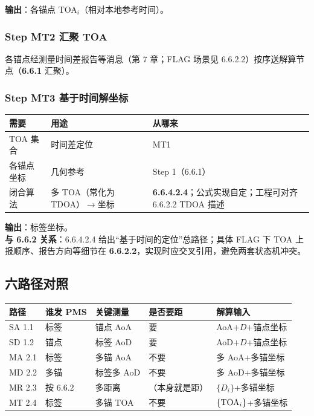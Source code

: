 \documentclass[11pt,a4paper]{ctexart}
\begin{document}
\textbf{输出}：各锚点 TOA$_i$（相对本地参考时间）。

\subsubsection{Step MT2 汇聚 TOA}

各锚点经测量时间差报告等消息（第 7 章；FLAG 场景见 6.6.2.2）按序送解算节点（\textbf{6.6.1} 汇聚）。

\subsubsection{Step MT3 基于时间解坐标}

\begin{table}[h]
\centering
\small
\begin{tabular}{L{3.4cm}L{4.8cm}L{4.8cm}}
\toprule
\textbf{需要} & \textbf{用途} & \textbf{从哪来} \\
\midrule
TOA 集合 & 时间差定位 & MT1 \\
各锚点坐标 & 几何参考 & Step 1（6.6.1） \\
闭合算法 & 多 TOA（常化为 TDOA）$\rightarrow$坐标 &
  \textbf{6.6.4.2.4}；公式实现自定；工程可对齐 6.6.2.2 TDOA 描述 \\
\bottomrule
\end{tabular}
\end{table}

\textbf{输出}：标签坐标。\\
\textbf{与 6.6.2 关系}：6.6.4.2.4 给出``基于时间的定位''总路径；具体 FLAG 下 TOA 上报顺序、报告方向等细节在 \textbf{6.6.2.2}，实现时应交叉引用，避免两套状态机冲突。

\subsection{六路径对照}

\begin{table}[h]
\centering
\small
\begin{tabular}{L{2.0cm}L{2.2cm}L{2.4cm}L{2.4cm}L{3.2cm}}
\toprule
\textbf{路径} & \textbf{谁发 PMS} & \textbf{关键测量} & \textbf{是否要距} & \textbf{解算输入} \\
\midrule
SA 1.1 & 标签 & 锚点 AoA & 要 & AoA+$D$+锚点坐标 \\
SD 1.2 & 锚点 & 标签 AoD & 要 & AoD+$D$+锚点坐标 \\
MA 2.1 & 标签 & 多锚 AoA & 不要 & 多 AoA+多锚坐标 \\
MD 2.2 & 多锚 & 标签多 AoD & 不要 & 多 AoD+多锚坐标 \\
MR 2.3 & 按 6.6.2 & 多距离 & （本身就是距） & $\{D_i\}$+多锚坐标 \\
MT 2.4 & 标签 & 多锚 TOA & 不要 & $\{{\rm TOA}_i\}$+多锚坐标 \\
\bottomrule
\end{tabular}
\end{table}
\end{document}
